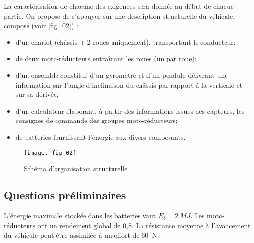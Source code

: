 %

La caractérisation de chacune des exigences sera donnée au début de chaque partie.
On propose de s’appuyer sur une description structurelle du véhicule, composé (voir \autoref{fig_02}) :
\begin{itemize}
\item d’un chariot (châssis + 2 roues uniquement), transportant le conducteur;
\item de deux moto-réducteurs entraînant les roues (un par roue);
\item d’un ensemble constitué d’un gyromètre et d’un pendule délivrant une information sur l’angle d’inclinaison du châssis par rapport à la verticale et sur sa dérivée;
\item d’un calculateur élaborant, à partir des informations issues des capteurs, les consignes de commande des groupes moto-réducteurs;
\item de batteries fournissant l’énergie aux divers composants.
\end{itemize}



\begin{figure}[H]
\centering
\texttt{[image: fig\_02]}
\caption{Schéma d’organisation structurelle \label{fig_02}}
\end{figure}
\fi
\subsection{Questions préliminaires}

\ifprof
\else

L’énergie maximale stockée dans les batteries vaut $E_b = \SI{2}{MJ}$. Les moto-réducteurs ont un rendement global de 0,8. La résistance moyenne à l’avancement du véhicule peut être assimilée à un effort de \SI{60}{N}.
\fi 


